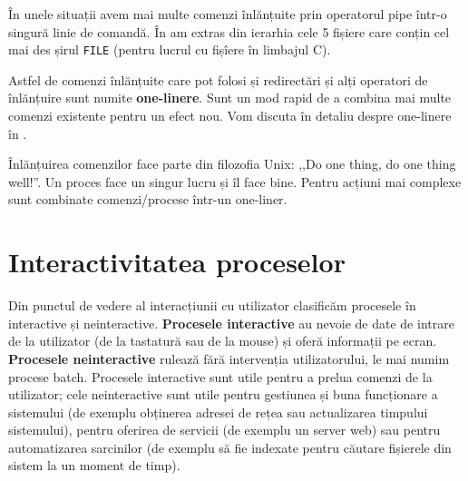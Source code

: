 În unele situații avem mai multe comenzi înlănțuite prin operatorul pipe într-o
singură linie de comandă.
În  am extras din ierarhia  cele 5 fișiere care conțin cel mai des șirul \texttt{FILE} (pentru lucrul cu fișîere în limbajul C).


Astfel de comenzi înlănțuite care pot folosi și redirectări și alți operatori de
înlănțuire sunt numite \textbf{one-linere}. Sunt un mod rapid de a combina mai
multe comenzi existente pentru un efect nou. Vom discuta în detaliu despre one-linere în .

\begin{note}
Înlănțuirea comenzilor face parte din filozofia Unix: ,,Do one thing, do
one thing well!''. Un proces face un singur lucru și îl face bine. Pentru acțiuni
mai complexe sunt combinate comenzi/procese într-un one-liner.
\end{note}

\section{Interactivitatea proceselor}
\label{sec:process-interactivitate}

Din punctul de vedere al interacțiunii cu utilizator clasificăm procesele în
interactive și neinteractive. \textbf{Procesele interactive} au nevoie de date de intrare
de la utilizator (de la tastatură sau de la mouse) și oferă informații pe ecran.
\textbf{Procesele neinteractive} rulează fără intervenția utilizatorului, le mai numim procese
batch. Procesele interactive sunt utile pentru a prelua comenzi de la
utilizator; cele neinteractive sunt utile pentru gestiunea și buna funcționare a
sistemului (de exemplu obținerea adresei de rețea sau actualizarea timpului
sistemului), pentru oferirea de servicii (de exemplu un server web) sau pentru
automatizarea sarcinilor (de exemplu să fie indexate pentru căutare fișierele
din sistem la un moment de timp).

